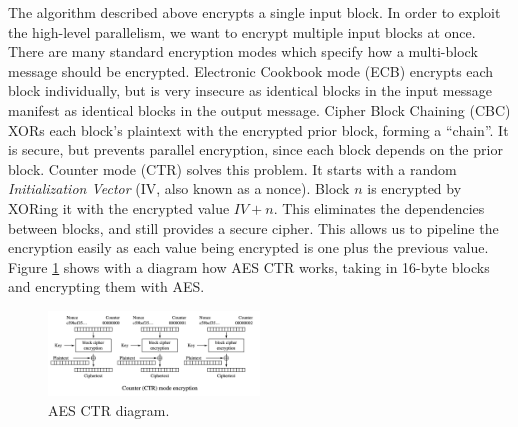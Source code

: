 The algorithm described above encrypts a single input block. In order to exploit the high-level parallelism, we want to encrypt multiple input blocks at once.
There are many standard encryption modes which specify how a multi-block message should be encrypted.
Electronic Cookbook mode (ECB) encrypts each block individually, but is very insecure as identical blocks in the input message manifest as identical blocks in the output message.
Cipher Block Chaining (CBC) XORs each block's plaintext with the encrypted prior block, forming a ``chain''. It is secure, but prevents parallel encryption, since each block depends on the prior block.
Counter mode (CTR) solves this problem. It starts with a random \emph{Initialization Vector} (IV, also known as a nonce). Block $n$ is encrypted by XORing it with the encrypted value $IV + n$.
This eliminates the dependencies between blocks, and still provides a secure cipher. 
This allows us to pipeline the encryption easily as each value being encrypted is one plus the previous value.
Figure \ref{fig:aesctr} shows with a diagram how AES CTR works, taking in 16-byte blocks and encrypting them with AES. 

\begin{figure}[h]
\centering
\includegraphics[width=0.5\textwidth]{aesctr}
\caption{AES CTR diagram.}
\label{fig:aesctr}
\end{figure}

